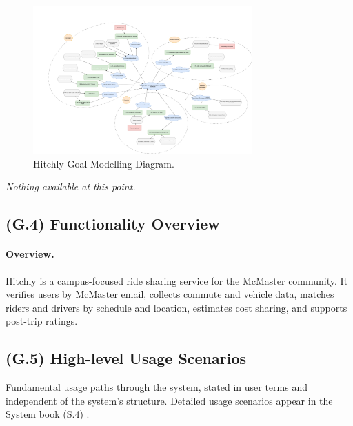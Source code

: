 \documentclass[12pt,letterpaper]{article}
\begin{document}
\begin{figure}[htbp]
  \centering
  \includegraphics[width=0.75\textwidth]{goal_model.png}
  \caption{Hitchly Goal Modelling Diagram.}
  \label{fig:ride-matching}
\end{figure}

\textit{Nothing available at this point.}

\subsection{(G.4) Functionality Overview}

\paragraph{Overview.}
Hitchly is a campus-focused ride sharing service for the McMaster community.
It verifies users by McMaster email, collects commute and vehicle data, matches riders and drivers by schedule and location, estimates cost sharing, and supports post-trip ratings.

\subsection{(G.5) High-level Usage Scenarios}
Fundamental usage paths through the system, stated in user terms and independent of the system's structure. Detailed usage scenarios appear in the System book (S.4) \cite{meyer2022}.
\end{document}
